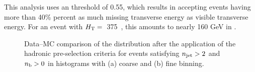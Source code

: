 This analysis uses an \alphat threshold of 0.55, which results in accepting
events having more than 40\% percent as much missing transverse energy as visible transverse
energy. For an event with $\mbox{$H_\text{T}$}=$~375~\gev, this amounts to nearly 160 GeV in \mht.  
%
\begin{figure}[!h]
  \centering
  \caption{Data--MC comparison of the \alphat distribution after 
           the application of the hadronic pre-selection 
           criteria for events satisfying $n_{\text{jet}} > 2$ and $n_{\text{b}} > 0$ 
           in histograms with (a) coarse and (b) fine binning.}
  \label{fig:figures_AlphaT_all}
\end{figure}

\FloatBarrier
